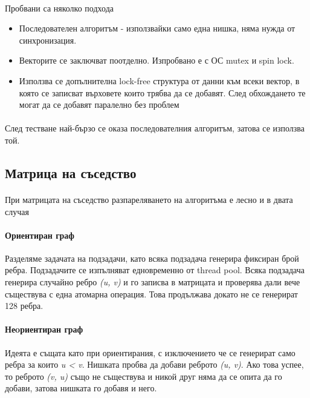 \paragraph*{} Пробвани са няколко подхода
\begin{itemize}
\item Последователен алгоритъм - използвайки само една нишка, няма нужда от синхронизация.
\item Векторите се заключват поотделно. Изпробвано е с ОС mutex и spin lock.
\item Използва се допълнителна lock-free структура от данни към всеки вектор, в която се записват върховете които трябва да се добавят. След обхождането те могат да се добавят паралелно без проблем
\end{itemize}

\paragraph*{} След тестване най-бързо се оказа последователния алгоритъм, затова се използва той.

\subsection{Матрица на съседство}

\paragraph*{} При матрицата на съседство разпареляването на алгоритъма е лесно и в двата случая

\paragraph*{Ориентиран граф} Разделяме задачата на подзадачи, като всяка подзадача генерира фиксиран брой ребра. Подзадачите се изпълняват едновременно от thread pool. Всяка подзадача генерира случайно ребро \textit{(u, v)} и го записва в матрицата и проверява дали вече съществува с една атомарна операция. Това продължава докато не се генерират 128 ребра.

\paragraph*{Неoриентиран граф} Идеята е същата като при ориентирания, с изключението че се генерират само ребра за които \textit{u < v}. Нишката пробва да добави реброто \textit{(u, v)}. Ако това успее, то реброто \textit{(v, u)} също не съществува и никой друг няма да се опита да го добави, затова нишката го добавя и него.

